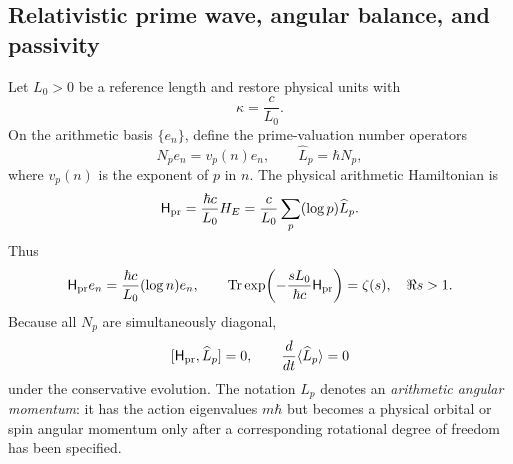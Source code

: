 \documentclass[11pt]{amsart}
\theoremstyle{definition}
\theoremstyle{remark}
\begin{document}
\subsection{Relativistic prime wave, angular balance, and passivity}
\label{subsec:relativistic-prime-wave}
Let $L_0>0$ be a reference length and restore physical units with
\begin{equation}\label{eq:relativisticScale}
 \kappa=\frac{c}{L_0}.
\end{equation}
On the arithmetic basis $\{e_n\}$, define the prime-valuation number operators
\begin{equation}\label{eq:primeNumberOperators}
 N_pe_n=v_p(n)e_n,
 \qquad
 \widehat L_p=\hbar N_p,
\end{equation}
where $v_p(n)$ is the exponent of $p$ in $n$.  The physical arithmetic Hamiltonian is
\begin{equation}\label{eq:physicalPrimeHamiltonian}
 \mathsf H_{\rm pr}
 =\frac{\hbar c}{L_0}H_E
 =\frac{c}{L_0}\sum_p(\log p)\widehat L_p.
\end{equation}
Thus
\begin{equation}\label{eq:physicalPrimeEnergy}
 \mathsf H_{\rm pr}e_n
 =\frac{\hbar c}{L_0}(\log n)e_n,
 \qquad
 \operatorname{Tr}\exp\!\left(-\frac{sL_0}{\hbar c}\mathsf H_{\rm pr}\right)
 =\zeta(s),\quad \Re s>1.
\end{equation}
Because all $N_p$ are simultaneously diagonal,
\begin{equation}\label{eq:angularMomentumCommutation}
 [\mathsf H_{\rm pr},\widehat L_p]=0,
 \qquad
 \frac{d}{dt}\langle\widehat L_p\rangle=0
\end{equation}
under the conservative evolution.  The notation $\widehat L_p$ denotes an
\emph{arithmetic angular momentum}: it has the action eigenvalues $m\hbar$ but becomes a
physical orbital or spin angular momentum only after a corresponding rotational degree of
freedom has been specified.
\end{document}

